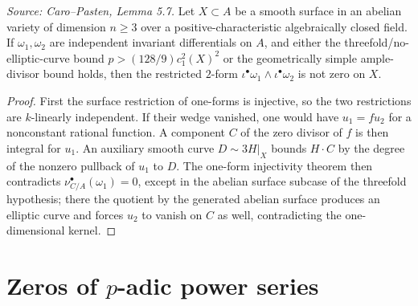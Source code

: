 \begin{lemma}
  \label{lem:cp_nonvanishing_two_forms}
  \textit{Source: Caro--Pasten, Lemma 5.7.}
  Let \(X\subset A\) be a smooth surface in an abelian variety of dimension
  \(n\ge3\) over a positive-characteristic algebraically closed field.  If
  \(\omega_1,\omega_2\) are independent invariant differentials on \(A\), and
  either the threefold/no-elliptic-curve bound
  \(p>(128/9)c_1^2(X)^2\) or the geometrically simple ample-divisor bound
  holds, then the restricted \(2\)-form
  \(\iota^\bullet\omega_1\wedge\iota^\bullet\omega_2\) is not zero on \(X\).
\end{lemma}
\begin{proof}
  First the surface restriction of one-forms is injective, so the two
  restrictions are \(k\)-linearly independent.  If their wedge vanished, one
  would have \(u_1=f u_2\) for a nonconstant rational function.  A component
  \(C\) of the zero divisor of \(f\) is then integral for \(u_1\).  An
  auxiliary smooth curve \(D\sim3H|_X\) bounds \(H\cdot C\) by the degree of
  the nonzero pullback of \(u_1\) to \(D\).  The one-form injectivity theorem
  then contradicts \(\nu_{C/A}^\bullet(\omega_1)=0\), except in the abelian
  surface subcase of the threefold hypothesis; there the quotient by the
  generated abelian surface produces an elliptic curve and forces \(u_2\) to
  vanish on \(C\) as well, contradicting the one-dimensional kernel.
\end{proof}

\section{Zeros of \texorpdfstring{\(p\)}{p}-adic power series}

